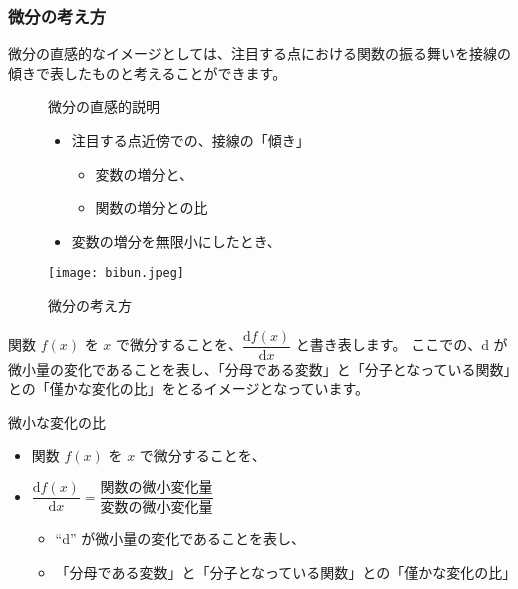 \documentclass[uplatex,dvipdfmx,a4paper,11pt]{jsarticle}
\begin{document}
\subsubsection{微分の考え方}
微分の直感的なイメージとしては、注目する点における関数の振る舞いを接線の傾きで表したものと考えることができます。
\begin{figure}[htb]
	\begin{center}
		\begin{minipage}{0.5\textwidth}
			\large
			\begin{itembox}[l]{微分の直感的説明}
				\begin{itemize}
					\item 注目する点近傍での、接線の「傾き」
					\begin{itemize}
						\item 変数の増分と、
						\item 関数の増分との比
					\end{itemize}
					\item 変数の増分を無限小にしたとき、
				\end{itemize}
			\end{itembox}
		\end{minipage}
		\begin{minipage}{0.4\textwidth}
			\begin{center}
			\texttt{[image: bibun.jpeg]}
			\end{center}
		\end{minipage}
		\caption{微分の考え方}
		\label{bibun}
	\end{center}
\end{figure}

関数 $f(x)$ を $x$ で微分することを、$\dfrac{\mathrm{d} f(x)}{\mathrm{d}x}$ と書き表します。
ここでの、d が微小量の変化であることを表し、「分母である変数」と「分子となっている関数」との「僅かな変化の比」をとるイメージとなっています。

\large
	\begin{itembox}[l]{微小な変化の比}
		\begin{itemize}
			\item 関数 $f(x)$ を $x$ で微分することを、
			\item $\dfrac{\mathrm{d} f(x)}{\mathrm{d}x}=\dfrac{\text{関数の微小変化量}}{変数の微小変化量}$ 
			\begin{itemize}
				\item ``d'' が微小量の変化であることを表し、
				\item 「分母である変数」と「分子となっている関数」との「僅かな変化の比」
			\end{itemize}
		\end{itemize}
	\end{itembox}
\normalsize
\end{document}

